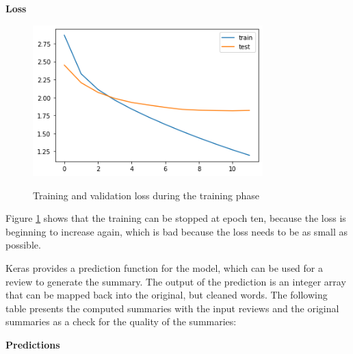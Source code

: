 \textbf{Loss}

\begin{figure}
	\begin{center}
		\includegraphics[width=3.5in]{photos/eval}\\
		\caption{Training and validation loss during the training phase}\label{eval}
	\end{center}
\end{figure}

Figure \ref{eval} shows that the training can be stopped at epoch ten, because the loss is beginning to increase again, which is bad because the loss needs to be as small as possible. 

Keras provides a prediction function for the model, which can be used for a review to generate the summary. The output of the prediction is an integer array that can be mapped back into the original, but cleaned words. The following table presents the computed summaries with the input reviews and the original summaries as a check for the quality of the summaries:

\textbf{Predictions}

